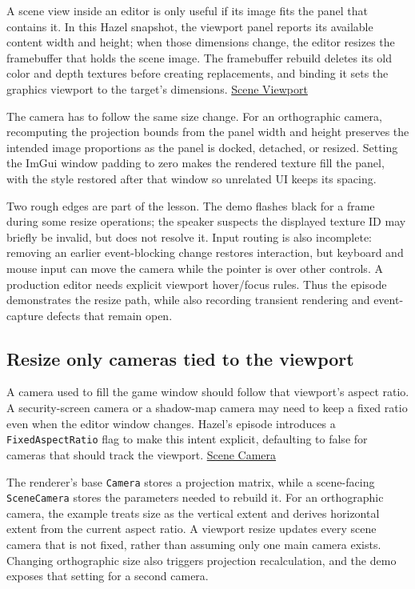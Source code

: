 A scene view inside an editor is only useful if its image fits the panel that contains it. In this Hazel snapshot, the viewport panel reports its available content width and height; when those dimensions change, the editor resizes the framebuffer that holds the scene image. The framebuffer rebuild deletes its old color and depth textures before creating replacements, and binding it sets the graphics viewport to the target's dimensions. \href{https://www.youtube.com/watch?v=xiSW4UgjLKU}{Scene Viewport}

The camera has to follow the same size change. For an orthographic camera, recomputing the projection bounds from the panel width and height preserves the intended image proportions as the panel is docked, detached, or resized. Setting the ImGui window padding to zero makes the rendered texture fill the panel, with the style restored after that window so unrelated UI keeps its spacing.

Two rough edges are part of the lesson. The demo flashes black for a frame during some resize operations; the speaker suspects the displayed texture ID may briefly be invalid, but does not resolve it. Input routing is also incomplete: removing an earlier event-blocking change restores interaction, but keyboard and mouse input can move the camera while the pointer is over other controls. A production editor needs explicit viewport hover/focus rules. Thus the episode demonstrates the resize path, while also recording transient rendering and event-capture defects that remain open.

\subsection{Resize only cameras tied to the viewport}\label{06-engine-ii-ch032-resize-only-cameras-tied-to-the-viewport}

\hypertarget{06-engine-ii-ch032-resize-only-cameras-tied-to-the-viewport}{}

A camera used to fill the game window should follow that viewport's aspect ratio. A security-screen camera or a shadow-map camera may need to keep a fixed ratio even when the editor window changes. Hazel's episode introduces a \texttt{FixedAspectRatio} flag to make this intent explicit, defaulting to false for cameras that should track the viewport. \href{https://www.youtube.com/watch?v=UKVFRRufKzo}{Scene Camera}

The renderer's base \texttt{Camera} stores a projection matrix, while a scene-facing \texttt{SceneCamera} stores the parameters needed to rebuild it. For an orthographic camera, the example treats size as the vertical extent and derives horizontal extent from the current aspect ratio. A viewport resize updates every scene camera that is not fixed, rather than assuming only one main camera exists. Changing orthographic size also triggers projection recalculation, and the demo exposes that setting for a second camera.

